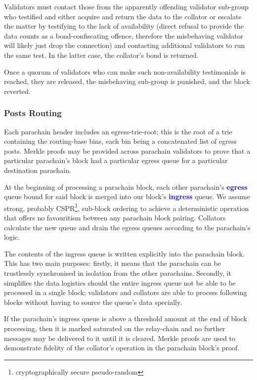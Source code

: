 \documentclass[t,usepdftitle=false]{beamer}
\renewcommand{\textit}[1]{\textcolor{blue}{\textbf{#1}}}
\begin{document}
\begin{frame}
 Validators must contact those from the apparently offending validator sub-group who testified and either acquire and return the data to the collator or escalate the matter by testifying to the lack of availability (direct refusal to provide the data counts as a bond-confiscating offence, therefore the misbehaving validator will likely just drop the connection) and contacting additional validators to run the same test. In the latter case, the collator's bond is returned.

 Once a quorum of validators who can make such non-availability testimonials is reached, they are released, the misbehaving sub-group is punished, and the block reverted.

\subsubsection{Posts Routing}
\label{posts-routing}

 Each parachain header includes an egress-trie-root; this is the root of a trie containing the routing-base bins, each bin being a concatenated list of egress posts. Merkle proofs may be provided across parachain validators to prove that a particular parachain's block had a particular egress queue for a particular destination parachain.

 At the beginning of processing a parachain block, each other parachain's \textit{egress} queue bound for said block is merged into our block's \textit{ingress} queue. We assume strong, probably CSPR\footnote{cryptographically secure pseudo-random}, sub-block ordering to achieve a deterministic operation that offers no favouritism between any parachain block pairing. Collators calculate the new queue and drain the egress queues according to the parachain's logic.

 The contents of the ingress queue is written explicitly into the parachain block. This has two main purposes: firstly, it means that the parachain can be trustlessly synchronised in isolation from the other parachains. Secondly, it simplifies the data logistics should the entire ingress queue not be able to be processed in a single block; validators and collators are able to process following blocks without having to source the queue's data specially.

 If the parachain's ingress queue is above a threshold amount at the end of block processing, then it is marked saturated on the relay-chain and no further messages may be delivered to it until it is cleared. Merkle proofs are used to demonstrate fidelity of the collator's operation in the parachain block's proof.


\end{frame}
\end{document}
